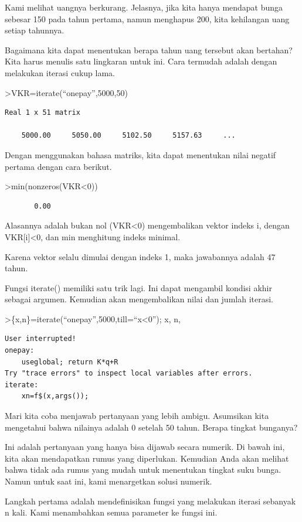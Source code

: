 \documentclass[
]{book}
\begin{document}
Kami melihat uangnya berkurang. Jelasnya, jika kita hanya mendapat bunga sebesar 150 pada tahun pertama, namun menghapus 200, kita kehilangan uang setiap tahunnya.

Bagaimana kita dapat menentukan berapa tahun uang tersebut akan bertahan? Kita harus menulis satu lingkaran untuk ini. Cara termudah adalah dengan melakukan iterasi cukup lama.

\textgreater VKR=iterate(``onepay'',5000,50)

\begin{verbatim}
Real 1 x 51 matrix

    5000.00     5050.00     5102.50     5157.63     ...
\end{verbatim}

Dengan menggunakan bahasa matriks, kita dapat menentukan nilai negatif pertama dengan cara berikut.

\textgreater min(nonzeros(VKR\textless0))

\begin{verbatim}
       0.00 
\end{verbatim}

Alasannya adalah bukan nol (VKR\textless0) mengembalikan vektor indeks i, dengan VKR{[}i{]}\textless0, dan min menghitung indeks minimal.

Karena vektor selalu dimulai dengan indeks 1, maka jawabannya adalah 47 tahun.

Fungsi iterate() memiliki satu trik lagi. Ini dapat mengambil kondisi akhir sebagai argumen. Kemudian akan mengembalikan nilai dan jumlah iterasi.

\textgreater\{x,n\}=iterate(``onepay'',5000,till=``x\textless0''); x, n,

\begin{verbatim}
User interrupted!
onepay:
    useglobal; return K*q+R 
Try "trace errors" to inspect local variables after errors.
iterate:
    xn=f$(x,args());
\end{verbatim}

Mari kita coba menjawab pertanyaan yang lebih ambigu. Asumsikan kita mengetahui bahwa nilainya adalah 0 setelah 50 tahun. Berapa tingkat bunganya?

Ini adalah pertanyaan yang hanya bisa dijawab secara numerik. Di bawah ini, kita akan mendapatkan rumus yang diperlukan. Kemudian Anda akan melihat bahwa tidak ada rumus yang mudah untuk menentukan tingkat suku bunga. Namun untuk saat ini, kami menargetkan solusi numerik.

Langkah pertama adalah mendefinisikan fungsi yang melakukan iterasi sebanyak n kali. Kami menambahkan semua parameter ke fungsi ini.
\end{document}
